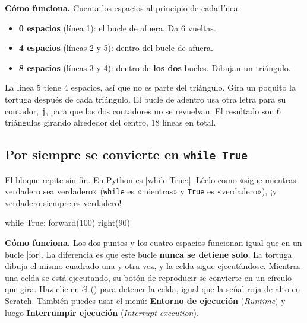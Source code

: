 \textbf{Cómo funciona.} Cuenta los espacios al principio de cada línea:
\begin{itemize}
  \item \textbf{0 espacios} (línea 1): el bucle de afuera. Da 6 vueltas.
  \item \textbf{4 espacios} (líneas 2 y 5): dentro del bucle de afuera.
  \item \textbf{8 espacios} (líneas 3 y 4): dentro de \textbf{los dos} bucles. Dibujan un triángulo.
\end{itemize}
La línea 5 tiene 4 espacios, así que no es parte del triángulo. Gira un poquito la tortuga después de cada triángulo. El bucle de adentro usa otra letra para su contador, \texttt{j}, para que los dos contadores no se revuelvan. El resultado son 6 triángulos girando alrededor del centro, 18 líneas en total.

\subsection*{Por siempre se convierte en \texttt{while True}}

El bloque  repite sin fin. En Python es \py|while True:|. Léelo como «sigue mientras verdadero sea verdadero» (\texttt{while} es «mientras» y \texttt{True} es «verdadero»), ¡y verdadero siempre es verdadero!

\begin{tcbraster}[raster columns=2, raster equal height=rows, raster column skip=12pt, raster valign=center]
\begin{tcolorbox}[colback=white, colframe=white, boxrule=0pt, valign=center]
\begin{scratch}[scale=0.85]
\end{scratch}
\end{tcolorbox}
\begin{code}
while True:
    forward(100)
    right(90)
\end{code}
\end{tcbraster}

\textbf{Cómo funciona.} Los dos puntos y los cuatro espacios funcionan igual que en un bucle \py|for|. La diferencia es que este bucle \textbf{nunca se detiene solo}. La tortuga dibuja el mismo cuadrado una y otra vez, y la celda sigue ejecutándose. Mientras una celda se está ejecutando, su botón de reproducir se convierte en un círculo que gira. Haz clic en él (\stopbtn) para detener la celda, igual que la señal roja de alto en Scratch. También puedes usar el menú: \textbf{Entorno de ejecución} (\textit{Runtime}) y luego \textbf{Interrumpir ejecución} (\textit{Interrupt execution}).

